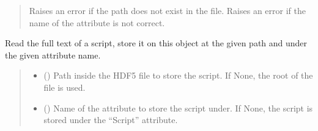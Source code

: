 \documentclass[letterpaper,10pt,english]{sphinxmanual}
\begin{document}
\begin{fulllineitems}
\begin{fulllineitems}
\begin{quote}
\begin{description}
\begin{itemize}
\end{itemize}

\sphinxAtStartPar
{\hyperref[\detokenize{source/_autosummary/HDF5_BLS.errors:HDF5_BLS.errors.WrapperError_StructureError}]{}} \textendash{} Raises an error if the path does not exist in the file.
    Raises an error if the name of the attribute is not correct.

\end{description}\end{quote}

\end{fulllineitems}


\begin{fulllineitems}
\label{\detokenize{source/_autosummary/HDF5_BLS.Wrapper:HDF5_BLS.Wrapper.store_script}}
\pysigstartsignatures
\pysiglinewithargsret
{}
{\sphinxparamcomma {}\sphinxparamcomma {}}
{}
\pysigstopsignatures
\sphinxAtStartPar
Read the full text of a script, store it on this object at the given path and under the given attribute name.
\begin{quote}\begin{description}
\begin{itemize}
\item {} 
\sphinxAtStartPar
{} (\sphinxstyleliteralemphasis{\sphinxupquote{, }}) \textendash{} Path inside the HDF5 file to store the script. If None, the root of the file is used.

\item {} 
\sphinxAtStartPar
{} (\sphinxstyleliteralemphasis{\sphinxupquote{, }}) \textendash{} Name of the attribute to store the script under. If None, the script is stored under the “Script” attribute.


\end{itemize}
\end{description}
\end{quote}
\end{fulllineitems}
\end{fulllineitems}
\end{document}
